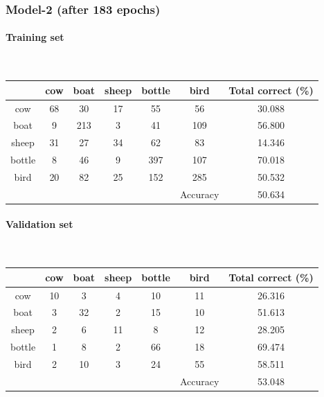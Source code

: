 \documentclass[fleqn]{article}
\newcommand{\myparagraph}[1]{\paragraph{#1}\mbox{}\\}
\begin{document}
\newpage
\subsubsection{Model-2 (after 183 epochs)}
\myparagraph{Training set}
\begin{center}
  \begin{longtable}{ c | c | c | c | c | c | c}
  	\multicolumn{1}{c}{} &
	\multicolumn{1}{c}{cow} & 
	\multicolumn{1}{c}{boat } & 
	\multicolumn{1}{c}{sheep } &
	\multicolumn{1}{c}{bottle } & 
	\multicolumn{1}{c}{bird } &
	\multicolumn{1}{c}{Total correct (\%) }\\
    \hline
    cow       &  68    &  30     & 17    &  55    &  56 		& 30.088\\\hline 
    boat      &  9     &  213    &  3    &  41    & 109 		& 56.800\\\hline
    sheep     &  31    &  27     & 34    &  62    &  83 		& 14.346\\\hline
    bottle    &   8    &  46     &  9    & 397    & 107 		& 70.018\\\hline
    bird      &  20    &  82     & 25    & 152    & 285 		& 50.532\\\hline
              &      &         &        &        &   Accuracy 	& 50.634\\\hline
  \end{longtable}
\end{center}

\myparagraph{Validation set}

\begin{center}
  \begin{longtable}{ c | c | c | c | c | c | c}
  	\multicolumn{1}{c}{} &
	\multicolumn{1}{c}{cow} & 
	\multicolumn{1}{c}{boat } & 
	\multicolumn{1}{c}{sheep } &
	\multicolumn{1}{c}{bottle } & 
	\multicolumn{1}{c}{bird } &
	\multicolumn{1}{c}{Total correct (\%) }\\
    \hline
    cow       &  10  &    3    &    4   &    10   &   	11 		& 26.316\\\hline 
    boat      &  3   &   32    &    2   &    15   &   	10 		& 51.613\\\hline
    sheep     &  2   &    6    &   11   &    8    &   	12 		& 28.205\\\hline
    bottle    &  1   &    8    &    2   &    66   &   	18 		& 69.474\\\hline
    bird      &  2   &   10    &    3   &    24   &   	55 		& 58.511\\\hline
              &      &         &        &         &   Accuracy 	& 53.048\\\hline
  \end{longtable}
\end{center}
 
\end{document}
